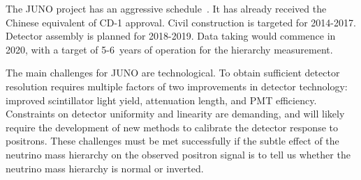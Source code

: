 The JUNO project has an aggressive schedule~\cite{yfwang_INPA_2013}.
It has already received the Chinese equivalent of CD-1 approval.
Civil construction is targeted for 2014-2017.  Detector assembly is
planned for 2018-2019.  Data taking would commence in 2020, with a
target of 5-6~years of operation for the hierarchy measurement.

 The main challenges for JUNO are technological.  To obtain
sufficient detector resolution requires multiple factors of two
improvements in detector technology: improved scintillator light yield,
attenuation length, and PMT efficiency.  Constraints on detector
uniformity and linearity are demanding, and will likely require the
development of new methods to calibrate the detector response to
positrons.   These challenges must be met successfully if the subtle effect of the neutrino mass hierarchy on the observed positron signal is to tell us whether the neutrino mass hierarchy is normal or inverted.


















